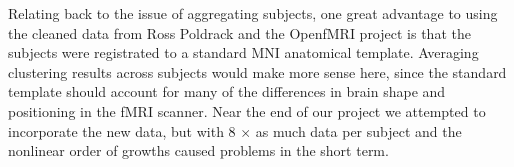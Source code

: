 \par Relating back to the issue of aggregating subjects, one great advantage 
to using the cleaned data from Ross Poldrack and the OpenfMRI project is that 
the subjects were registrated to a standard MNI anatomical template. Averaging 
clustering results across subjects would make more sense here, since the 
standard template should account for many of the differences in brain shape 
and positioning in the fMRI scanner. Near the end of our project we attempted
to incorporate the new data, but with 8 $\times$ as much data per subject and 
the nonlinear order of growths caused problems in the short term.
